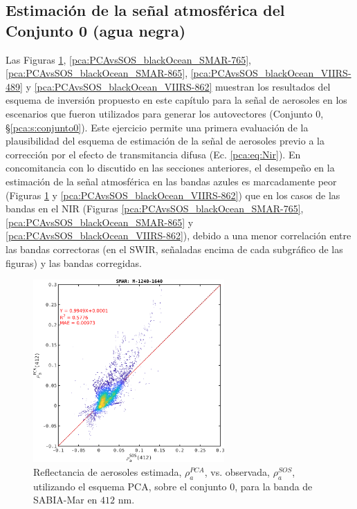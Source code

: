     \subsection{Estimación de la señal atmosférica del Conjunto 0 (agua negra)}
    \label{pca:s:results:rho_a_conjunto0}

        Las Figuras \ref{pca:PCAvsSOS_blackOcean_SMAR-412}, \ref{pca:PCAvsSOS_blackOcean_SMAR-765}, \ref{pca:PCAvsSOS_blackOcean_SMAR-865}, \ref{pca:PCAvsSOS_blackOcean_VIIRS-489} y \ref{pca:PCAvsSOS_blackOcean_VIIRS-862} muestran los resultados del esquema de inversión propuesto en este capítulo para la señal de aerosoles en los escenarios que fueron utilizados para generar los autovectores (Conjunto $0$, \S \ref{pca:s:conjunto0}). Este ejercicio permite una primera evaluación de la plausibilidad del esquema de estimación de la señal de aerosoles previo a la corrección por el efecto de transmitancia difusa (Ec. \ref{pca:eq:Nir}). En concomitancia con lo discutido en las secciones anteriores, el desempeño en la estimación de la señal atmosférica en las bandas azules es marcadamente peor (Figuras \ref{pca:PCAvsSOS_blackOcean_SMAR-412} y \ref{pca:PCAvsSOS_blackOcean_VIIRS-862}) que en los casos de las bandas en el NIR (Figuras \ref{pca:PCAvsSOS_blackOcean_SMAR-765}, \ref{pca:PCAvsSOS_blackOcean_SMAR-865} y \ref{pca:PCAvsSOS_blackOcean_VIIRS-862}), debido a una menor correlación entre las bandas correctoras (en el SWIR, señaladas encima de cada subgráfico de las figuras) y las bandas corregidas.

        \begin{figure}
        \centering
        \includegraphics[width=0.65\textwidth]{pca/figures/PCAvsSOS_blackOcean_SMAR-412.png}
        \caption[Reflectancia de aerosoles estimada por PCA vs. simulada para la banda de SABIA-Mar en $412$ nm.]{Reflectancia de aerosoles estimada, $\rho_{a}^{PCA}$, vs. observada, $\rho_{a}^{SOS}$, utilizando el esquema PCA, sobre el conjunto $0$, para la banda de SABIA-Mar en $412$ nm.}
        \label{pca:PCAvsSOS_blackOcean_SMAR-412}
        \end{figure}

